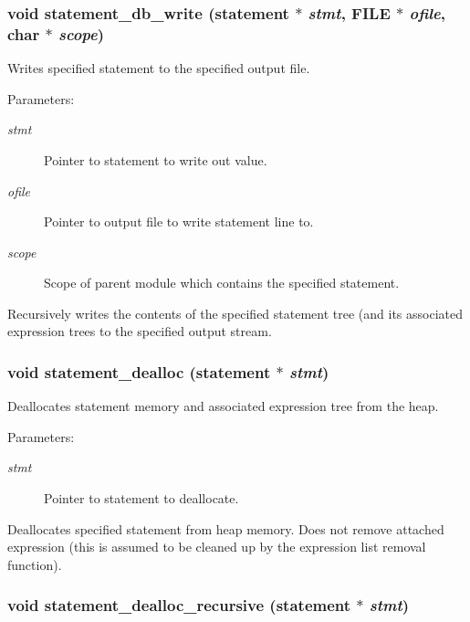 \subsubsection{\setlength{\rightskip}{0pt plus 5cm}void statement\_\-db\_\-write ({\bf statement} $\ast$ {\em stmt}, FILE $\ast$ {\em ofile}, char $\ast$ {\em scope})}\label{statement_8h_a1}


Writes specified statement to the specified output file.

\begin{Desc}
\item[Parameters:]
\begin{description}
\item[{\em stmt}]Pointer to statement to write out value. \item[{\em ofile}]Pointer to output file to write statement line to. \item[{\em scope}]Scope of parent module which contains the specified statement.\end{description}
\end{Desc}
Recursively writes the contents of the specified statement tree (and its associated expression trees to the specified output stream. 
\subsubsection{\setlength{\rightskip}{0pt plus 5cm}void statement\_\-dealloc ({\bf statement} $\ast$ {\em stmt})}\label{statement_8h_a6}


Deallocates statement memory and associated expression tree from the heap.

\begin{Desc}
\item[Parameters:]
\begin{description}
\item[{\em stmt}]Pointer to statement to deallocate.\end{description}
\end{Desc}
Deallocates specified statement from heap memory. Does not remove attached expression (this is assumed to be cleaned up by the expression list removal function). 
\subsubsection{\setlength{\rightskip}{0pt plus 5cm}void statement\_\-dealloc\_\-recursive ({\bf statement} $\ast$ {\em stmt})}\label{statement_8h_a5}


